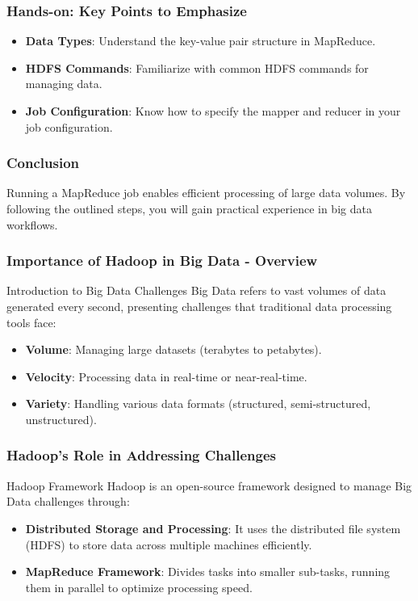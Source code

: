 \documentclass[aspectratio=169]{beamer}
\begin{document}
\begin{frame}[fragile]
    \frametitle{Hands-on: Key Points to Emphasize}
    \begin{itemize}
        \item \textbf{Data Types}: Understand the key-value pair structure in MapReduce.
        \item \textbf{HDFS Commands}: Familiarize with common HDFS commands for managing data.
        \item \textbf{Job Configuration}: Know how to specify the mapper and reducer in your job configuration.
    \end{itemize}
\end{frame}

\begin{frame}[fragile]
    \frametitle{Conclusion}
    Running a MapReduce job enables efficient processing of large data volumes. By following the outlined steps, you will gain practical experience in big data workflows. 
\end{frame}

\begin{frame}[fragile]
    \frametitle{Importance of Hadoop in Big Data - Overview}
    \begin{block}{Introduction to Big Data Challenges}
        Big Data refers to vast volumes of data generated every second, presenting challenges that traditional data processing tools face:
        \begin{itemize}
            \item \textbf{Volume}: Managing large datasets (terabytes to petabytes).
            \item \textbf{Velocity}: Processing data in real-time or near-real-time.
            \item \textbf{Variety}: Handling various data formats (structured, semi-structured, unstructured).
        \end{itemize}
    \end{block}
\end{frame}

\begin{frame}[fragile]
    \frametitle{Hadoop's Role in Addressing Challenges}
    \begin{block}{Hadoop Framework}
        Hadoop is an open-source framework designed to manage Big Data challenges through:
        \begin{itemize}
            \item \textbf{Distributed Storage and Processing}: 
            It uses the distributed file system (HDFS) to store data across multiple machines efficiently.
            \item \textbf{MapReduce Framework}: 
            Divides tasks into smaller sub-tasks, running them in parallel to optimize processing speed.
        \end{itemize}
    \end{block}
\end{frame}
\end{document}
